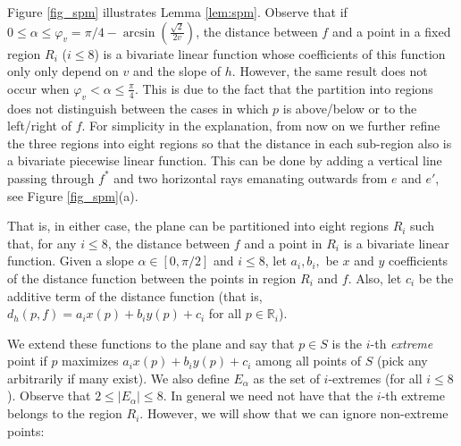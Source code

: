\documentclass{llncs}
\def\R{\mathbb{R}}
\begin{document}
Figure \ref{fig_spm} illustrates Lemma \ref{lem:spm}.
Observe that if $0\leq\alpha\leq\varphi_v=\pi/4-\arcsin(\frac{\sqrt{2}}{2v})$, the distance between $f$ and a point in a fixed region $R_i$ ($i\leq 8$) is a bivariate linear function whose coefficients of this function only only depend on $v$ and the slope of $h$. However, the same result does not occur when $\varphi_v<\alpha\leq\frac{\pi}{4}$. This is due to the fact that the partition into regions does not distinguish between the cases in which $p$ is above/below or to the left/right of $f$. For simplicity in the explanation, from now on we further refine the three regions into eight regions so that the distance in each sub-region also is a bivariate piecewise linear function. This can be done by adding a vertical line passing through $f^*$ and two horizontal rays emanating outwards from  $e$ and $e'$, see Figure \ref{fig_spm}(a).

That is, in either case, the plane can be partitioned into eight regions $R_i$ such that, for any $i\leq 8$, the distance between $f$ and a point in $R_i$ is a bivariate linear function. Given a slope $\alpha\in[0,\pi/2]$ and $i\leq 8$, let $a_i,b_i,$ be $x$ and $y$ coefficients of the distance function between the points in region $R_i$ and $f$. Also, let $c_i$ be the additive term of the distance function (that is, $d_h(p,f)=a_ix(p)+b_iy(p)+c_i$ for all $p\in \R_i$).

We extend these functions to the plane and say that $p \in S$ is the $i$-th {\em extreme} point if $p$ maximizes $a_ix(p)+b_iy(p)+c_i$ among all points of $S$ (pick any arbitrarily if many exist). We also define $E_{\alpha}$ as the set of $i$-extremes (for all $i\leq 8$). Observe that $2\leq |E_{\alpha}|\leq 8$. In general we need not have that the $i$-th extreme belongs to the region $R_i$. However, we will show that we can ignore non-extreme points:
\end{document}
